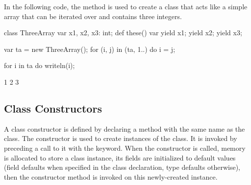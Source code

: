 \begin{example}
In the following code, the  method is used to create a
class that acts like a simple array that can be iterated over and
contains three integers.
\begin{chapelpre}
\end{chapelpre}
\begin{chapel}
class ThreeArray {
  var x1, x2, x3: int;
  def these() var {
    yield x1;
    yield x2;
    yield x3;
  }
}
\end{chapel}
\begin{chapelpost}
var ta = new ThreeArray();
for (i, j) in (ta, 1..) do
  i = j;

for i in ta do
  writeln(i);
\end{chapelpost}
\begin{chapeloutput}
1
2
3
\end{chapeloutput}

\end{example}

\subsection{Class Constructors}
\label{Class_Constructors}

A class constructor is defined by declaring a method with the same
name as the class.  The constructor is used to create instances of the
class. It is invoked by preceding a call to it with the 
keyword.  When the constructor is called, memory is allocated to store
a class instance, its fields are initialized to default values
(field defaults when specified in the class declaration, type defaults
otherwise), then the constructor method is invoked on this newly-created
instance.

